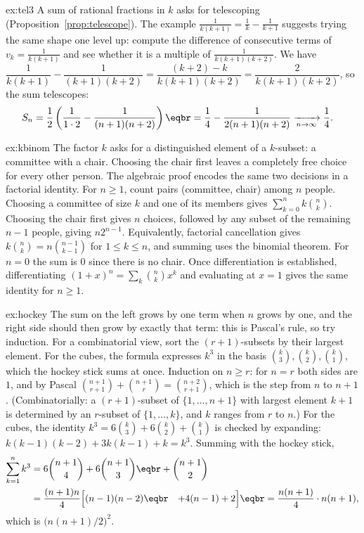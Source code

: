 \begin{solution}{ex:tel3}
\idea A sum of rational fractions in $k$ asks for telescoping (Proposition~\ref{prop:telescope}). The example $\frac1{k(k+1)}=\frac1k-\frac1{k+1}$ suggests trying the same shape one level up: compute the difference of consecutive terms of $v_k=\frac1{k(k+1)}$ and see whether it is a multiple of $\frac1{k(k+1)(k+2)}$.
\writeup We have $\dfrac1{k(k+1)}-\dfrac1{(k+1)(k+2)}=\dfrac{(k+2)-k}{k(k+1)(k+2)}=\dfrac2{k(k+1)(k+2)}$, so the sum telescopes:
\[
\begin{aligned}S_n&=\frac12\left(\frac1{1\cdot2}-\frac1{(n+1)(n+2)}\right)\eqbr=\frac14-\frac1{2(n+1)(n+2)}\xrightarrow[n\to\infty]{}\frac14.\end{aligned}
\]
\end{solution}

\begin{solution}{ex:kbinom}
\idea The factor $k$ asks for a distinguished element of a $k$-subset: a committee with a chair. Choosing the chair first leaves a completely free choice for every other person. The algebraic proof encodes the same two decisions in a factorial identity.
\writeup For $n\ge1$, count pairs (committee, chair) among $n$ people. Choosing a committee of size $k$ and one of its members gives $\sum_{k=0}^n k\binom nk$. Choosing the chair first gives $n$ choices, followed by any subset of the remaining $n-1$ people, giving $n2^{n-1}$. Equivalently, factorial cancellation gives $k\binom nk=n\binom{n-1}{k-1}$ for $1\le k\le n$, and summing uses the binomial theorem. For $n=0$ the sum is $0$ since there is no chair. Once differentiation is established, differentiating $(1+x)^n=\sum_k\binom nkx^k$ and evaluating at $x=1$ gives the same identity for $n\ge1$.
\end{solution}

\begin{solution}{ex:hockey}
\idea The sum on the left grows by one term when $n$ grows by one, and the right side should then grow by exactly that term: this is Pascal's rule, so try induction. For a combinatorial view, sort the $(r+1)$-subsets by their largest element. For the cubes, the formula expresses $k^3$ in the basis $\binom k3,\binom k2,\binom k1$, which the hockey stick sums at once.
\writeup Induction on $n\ge r$: for $n=r$ both sides are $1$, and by Pascal
$\binom{n+1}{r+1}+\binom{n+1}{r}=\binom{n+2}{r+1}$, which is the step from $n$ to $n+1$.
(Combinatorially: a $(r+1)$-subset of $\{1,\dots,n+1\}$ with largest element $k+1$ is determined by an
$r$-subset of $\{1,\dots,k\}$, and $k$ ranges from $r$ to $n$.)
For the cubes, the identity $k^3=6\binom k3+6\binom k2+\binom k1$ is checked by expanding:
$k(k-1)(k-2)+3k(k-1)+k=k^3$. Summing with the hockey stick,
\[
\begin{aligned}
\sum_{k=1}^nk^3&=6\binom{n+1}4+6\binom{n+1}3\eqbr+\binom{n+1}2\\
&=\frac{(n+1)n}{4}\Bigl[(n-1)(n-2)\Bigr.\eqbr\Bigl.\quad+4(n-1)+2\Bigr]\eqbr=\frac{n(n+1)}4\cdot n(n+1),
\end{aligned}
\]
which is $\bigl(n(n+1)/2\bigr)^2$.
\end{solution}

